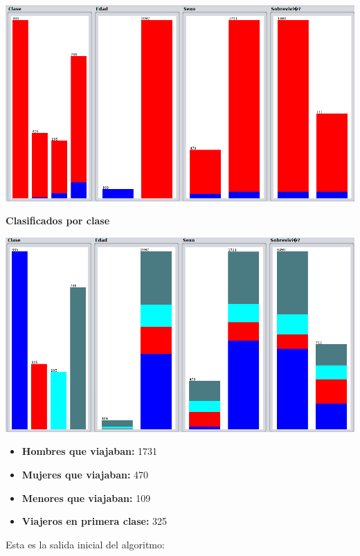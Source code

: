 \documentclass{article}
\begin{document}
\begin{center}
\includegraphics[scale=0.3]{images/edad.png}
\end{center}

\newpage

\textbf{Clasificados por clase}

\begin{center}
\includegraphics[scale=0.3]{images/clase.png}
\end{center}

\begin{itemize}
\item \textbf{Hombres que viajaban:} 1731
\item \textbf{Mujeres que viajaban:} 470
\item \textbf{Menores que viajaban:} 109
\item \textbf{Viajeros en primera clase:} 325
\end{itemize}

Esta es la salida inicial del algoritmo:
\end{document}
